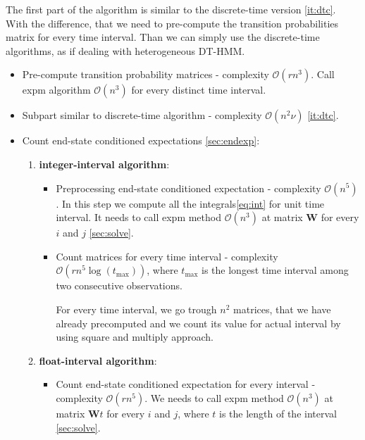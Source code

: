 \documentclass[thesis=M,english]{FITthesis}[2012/10/20]
\newcommand{\matr}[1]{\mathbf{#1}}
\begin{document}
\begin{itemize}
The first part of the algorithm is similar to the discrete-time version \ref{it:dtc}. With the difference, that we need to pre-compute the transition probabilities matrix for every time interval. Than we can simply use the discrete-time algorithms, as if dealing with heterogeneous DT-HMM. 


\begin{itemize}\label{it:ctc}
\item Pre-compute transition probability matrices - complexity $\mathcal{O}(r n^3)$. Call expm algorithm $\mathcal{O}(n^3)$ \cite{Mo03} for every distinct time interval. 
\item Subpart similar to discrete-time algorithm - complexity $\mathcal{O}(n^2 \nu)$ \ref{it:dtc}.
\item 

Count end-state conditioned expectations \ref{sec:endexp}:
\begin{enumerate}[resume]
\setcounter{enumi}{0}
\item \textbf{integer-interval algorithm}:

\begin{itemize}
\item Preprocessing end-state conditioned expectation - complexity $\mathcal{O}(n^5)$. 
    In this step we compute all the integrals\eqref{eq:int} for unit time interval. It needs to call expm method $\mathcal{O}(n^3)$ at matrix $\matr{W}$ for every $i$ and $j$ \ref{sec:solve}.   
\item Count matrices for every time interval - complexity $\mathcal{O}(r n^5\log(t_{\max}))$, where $t_{\max}$ is the longest time interval among two consecutive observations.

For every time interval, we go trough $n^2$ matrices, that we have already precomputed and we count its value for actual interval by using square and multiply approach. 


\end{itemize}

\item \textbf{float-interval algorithm}: 
\begin{itemize}
\item Count end-state conditioned expectation for every interval - complexity $\mathcal{O}(r n^5)$. 
We needs to call expm method $\mathcal{O}(n^3)$ at matrix $\matr{W}t$ for every $i$ and $j$, where $t$ is the length of the interval \ref{sec:solve}.
\end{itemize}
\end{enumerate}
 

\end{itemize}
\end{itemize}
\end{document}
